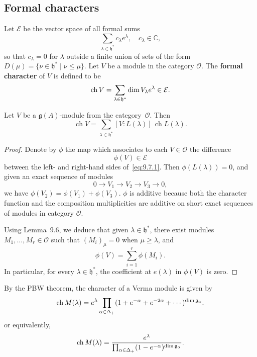 \documentclass[12pt]{article}
\begin{document}
\subsection{Formal characters}
Let $\mathcal{E}$ be the vector space of all formal sums
\[\sum_{\lambda \in \mathfrak{h}^*} c_\lambda e^\lambda, \quad c_\lambda \in \mathbb{C},\]
so that $c_\lambda = 0$ for $\lambda$ outside a finite union of sets of the form $D(\mu) = \{\nu \in \mathfrak{h}^* \mid \nu \leq \mu\}$. Let $V$ be a module in the category $\mathcal{O}$. The \textbf{formal character} of $V$ is defined to be
\[\operatorname{ch} V = \sum_{\lambda \in \mathfrak{h}^*}\dim V_\lambda e^\lambda \in \mathcal{E}.\]

\begin{proposition}[9.7]
Let $V$ be a $\mathfrak{g}(A)$-module from the category~$\mathcal{O}$. Then
\begin{equation}\label{eq:9.7.1}
\operatorname{ch} V
= \sum_{\lambda \in \mathfrak{h}^*} [V : L(\lambda)]\, \operatorname{ch} L(\lambda).
\end{equation}
\end{proposition}

\begin{proof}
Denote by $\phi$ the map which associates to each $V \in \mathcal{O}$ the difference
\[
\phi(V) \in \mathcal{E}
\]
between the left- and right-hand sides of~\eqref{eq:9.7.1}.
Then $\phi(L(\lambda)) = 0$, and given an exact sequence of modules
\[
0 \to V_1 \to V_2 \to V_3 \to 0,
\]
we have $\phi(V_2) = \phi(V_1) + \phi(V_3)$. $\phi$ is additive because both the character function and the composition multiplicities are additive on short exact sequences of modules in category $\mathcal{O}$.

Using Lemma~9.6, we deduce that given $\lambda \in \mathfrak{h}^*$, there exist modules
$M_1,\dots,M_r \in \mathcal{O}$ such that $(M_i)_\mu = 0$ when $\mu \ge \lambda$, and
\[
\phi(V) = \sum_{i=1}^r \phi(M_i).
\]
In particular, for every $\lambda \in \mathfrak{h}^*$, the coefficient at $e(\lambda)$ in $\phi(V)$ is zero.
\end{proof}

By the PBW theorem, the character of a Verma module is given by
\[
\operatorname{ch} M(\lambda) = e^\lambda \prod_{\alpha \in \Delta_+} (1 + e^{-\alpha} + e^{-2\alpha} + \cdots)^{\dim \mathfrak{g}_\alpha}.
\] or equivalently,
\[
\operatorname{ch} M(\lambda) = \frac{e^\lambda}{\prod_{\alpha \in \Delta_+} (1 - e^{-\alpha})^{\dim \mathfrak{g}_\alpha}}.
\]
\end{document}
